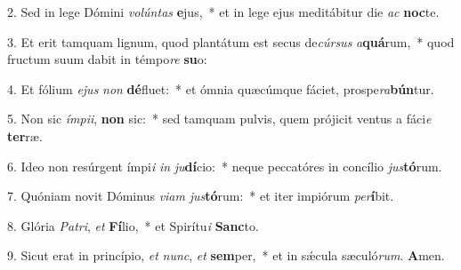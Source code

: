 2. Sed in lege Dómini \textit{vo}\textit{lún}\textit{tas} \textbf{e}jus,~*  et in lege ejus meditábitur die \textit{ac} \textbf{noc}te.\

3. Et erit tamquam lignum, quod plantátum est secus de\textit{cúr}\textit{sus} \textit{a}\textbf{quá}rum,~*  quod fructum suum dabit in témpo\textit{re} \textbf{su}o:\

4. Et fólium \textit{e}\textit{jus} \textit{non} \textbf{dé}fluet:~*  et ómnia quæcúmque fáciet, prospe\textit{ra}\textbf{bún}tur.\

5. Non sic \textit{ím}\textit{pi}\textit{i}, \textbf{non} sic:~*  sed tamquam pulvis, quem prójicit ventus a fáci\textit{e} \textbf{ter}ræ.\

6. Ideo non resúrgent ímpi\textit{i} \textit{in} \textit{ju}\textbf{dí}cio:~*  neque peccatóres in concílio \textit{jus}\textbf{tó}rum.\

7. Quóniam novit Dóminus \textit{vi}\textit{am} \textit{jus}\textbf{tó}rum:~*  et iter impiórum \textit{per}\textbf{í}bit.\

8. Glória \textit{Pa}\textit{tri}, \textit{et} \textbf{Fí}lio,~*  et Spirítu\textit{i} \textbf{Sanc}to.\

9. Sicut erat in princípio, \textit{et} \textit{nunc}, \textit{et} \textbf{sem}per,~*  et in sǽcula sæculó\textit{rum}. \textbf{A}men.\

